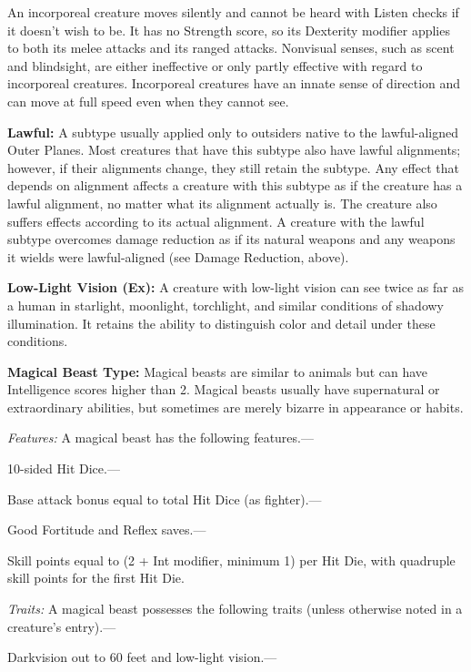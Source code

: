 \documentclass{article}
\begin{document}
An incorporeal creature moves silently and cannot be heard with Listen checks if 
it doesn't wish to be. It has no Strength score, so its Dexterity modifier applies 
to both its melee attacks and its ranged attacks. Nonvisual senses, such as scent 
and blindsight, are either ineffective or only partly effective with regard to 
incorporeal creatures. Incorporeal creatures have an innate sense of direction 
and can move at full speed even when they cannot see.

\vspace{12pt}
\textbf{Lawful: }A subtype usually applied only to outsiders native to the lawful-aligned 
Outer Planes. Most creatures that have this subtype also have lawful alignments; 
however, if their alignments change, they still retain the subtype. Any effect 
that depends on alignment affects a creature with this subtype as if the creature 
has a lawful alignment, no matter what its alignment actually is. The creature 
also suffers effects according to its actual alignment. A creature with the lawful 
subtype overcomes damage reduction as if its natural weapons and any weapons it 
wields were lawful-aligned (see Damage Reduction, above).

\vspace{12pt}
\textbf{Low-Light Vision (Ex):} A creature with low-light vision can see twice 
as far as a human in starlight, moonlight, torchlight, and similar conditions of 
shadowy illumination. It retains the ability to distinguish color and detail under 
these conditions.

\vspace{12pt}
\textbf{Magical Beast Type:} Magical beasts are similar to animals but can have 
Intelligence scores higher than 2. Magical beasts usually have supernatural or 
extraordinary abilities, but sometimes are merely bizarre in appearance or habits.

\textit{Features: }A magical beast has the following features.---

10-sided Hit Dice.---

Base attack bonus equal to total Hit Dice (as fighter).---

Good Fortitude and Reflex saves.---

Skill points equal to (2 + Int modifier, minimum 1) per Hit Die, with quadruple 
skill points for the first Hit Die.

\textit{Traits: }A magical beast possesses the following traits (unless otherwise 
noted in a creature's entry).---

Darkvision out to 60 feet and low-light vision.---
\end{document}
